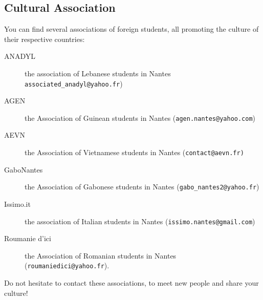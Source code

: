 
\subsection{Cultural Association}
You can find several associations of foreign students, all promoting the culture of their respective countries:
\begin{description}
    \item[ANADYL] the association of Lebanese students in Nantes \texttt{associated\_anadyl@yahoo.fr})
    \item[AGEN] the Association of Guinean students in Nantes (\texttt{agen.nantes@yahoo.com})
    \item[AEVN]  the Association of Vietnamese students in Nantes (\texttt{contact@aevn.fr)}
    \item[GaboNantes] the Association of Gabonese students in Nantes (\texttt{gabo\_nantes2@yahoo.fr})
    \item[Issimo.it] the association of Italian students in Nantes (\texttt{issimo.nantes@gmail.com})
    \item[Roumanie d'ici] the Association of Romanian students in Nantes (\texttt{roumaniedici@yahoo.fr}).
\end{description}
Do not hesitate to contact these associations, to meet new people and share your culture!

